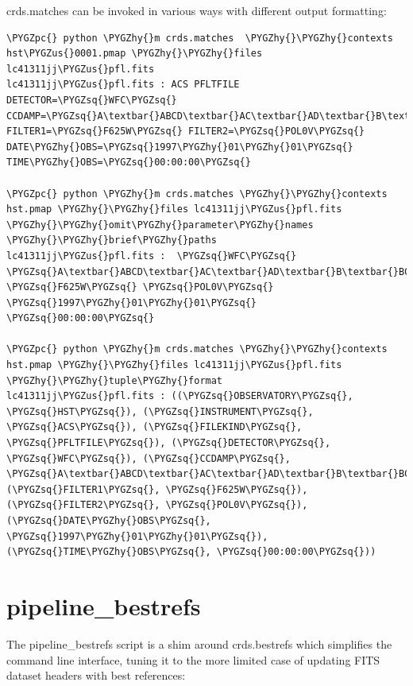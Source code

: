 \documentclass[letterpaper,10pt,english]{sphinxmanual}
\def\PYGZus{\char`\_}
\def\PYGZpc{\char`\%}
\def\PYGZhy{\char`\-}
\def\PYGZsq{\char`\'}
\renewcommand\PYGZsq{\textquotesingle}
\begin{document}
crds.matches can be invoked in various ways with different output formatting:

\begin{Verbatim}[commandchars=\\\{\}]
\PYGZpc{} python \PYGZhy{}m crds.matches  \PYGZhy{}\PYGZhy{}contexts hst\PYGZus{}0001.pmap \PYGZhy{}\PYGZhy{}files lc41311jj\PYGZus{}pfl.fits
lc41311jj\PYGZus{}pfl.fits : ACS PFLTFILE DETECTOR=\PYGZsq{}WFC\PYGZsq{} CCDAMP=\PYGZsq{}A\textbar{}ABCD\textbar{}AC\textbar{}AD\textbar{}B\textbar{}BC\textbar{}BD\textbar{}C\textbar{}D\PYGZsq{} FILTER1=\PYGZsq{}F625W\PYGZsq{} FILTER2=\PYGZsq{}POL0V\PYGZsq{} DATE\PYGZhy{}OBS=\PYGZsq{}1997\PYGZhy{}01\PYGZhy{}01\PYGZsq{} TIME\PYGZhy{}OBS=\PYGZsq{}00:00:00\PYGZsq{}

\PYGZpc{} python \PYGZhy{}m crds.matches \PYGZhy{}\PYGZhy{}contexts hst.pmap \PYGZhy{}\PYGZhy{}files lc41311jj\PYGZus{}pfl.fits \PYGZhy{}\PYGZhy{}omit\PYGZhy{}parameter\PYGZhy{}names \PYGZhy{}\PYGZhy{}brief\PYGZhy{}paths
lc41311jj\PYGZus{}pfl.fits :  \PYGZsq{}WFC\PYGZsq{} \PYGZsq{}A\textbar{}ABCD\textbar{}AC\textbar{}AD\textbar{}B\textbar{}BC\textbar{}BD\textbar{}C\textbar{}D\PYGZsq{} \PYGZsq{}F625W\PYGZsq{} \PYGZsq{}POL0V\PYGZsq{} \PYGZsq{}1997\PYGZhy{}01\PYGZhy{}01\PYGZsq{} \PYGZsq{}00:00:00\PYGZsq{}

\PYGZpc{} python \PYGZhy{}m crds.matches \PYGZhy{}\PYGZhy{}contexts hst.pmap \PYGZhy{}\PYGZhy{}files lc41311jj\PYGZus{}pfl.fits \PYGZhy{}\PYGZhy{}tuple\PYGZhy{}format
lc41311jj\PYGZus{}pfl.fits : ((\PYGZsq{}OBSERVATORY\PYGZsq{}, \PYGZsq{}HST\PYGZsq{}), (\PYGZsq{}INSTRUMENT\PYGZsq{}, \PYGZsq{}ACS\PYGZsq{}), (\PYGZsq{}FILEKIND\PYGZsq{}, \PYGZsq{}PFLTFILE\PYGZsq{}), (\PYGZsq{}DETECTOR\PYGZsq{}, \PYGZsq{}WFC\PYGZsq{}), (\PYGZsq{}CCDAMP\PYGZsq{}, \PYGZsq{}A\textbar{}ABCD\textbar{}AC\textbar{}AD\textbar{}B\textbar{}BC\textbar{}BD\textbar{}C\textbar{}D\PYGZsq{}), (\PYGZsq{}FILTER1\PYGZsq{}, \PYGZsq{}F625W\PYGZsq{}), (\PYGZsq{}FILTER2\PYGZsq{}, \PYGZsq{}POL0V\PYGZsq{}), (\PYGZsq{}DATE\PYGZhy{}OBS\PYGZsq{}, \PYGZsq{}1997\PYGZhy{}01\PYGZhy{}01\PYGZsq{}), (\PYGZsq{}TIME\PYGZhy{}OBS\PYGZsq{}, \PYGZsq{}00:00:00\PYGZsq{}))
\end{Verbatim}


\section{pipeline\_bestrefs}
\label{command_line_tools:pipeline-bestrefs}
The pipeline\_bestrefs script is a shim around crds.bestrefs which simplifies the command line interface,
tuning it to the more limited case of updating FITS dataset headers with best references:
\end{document}
